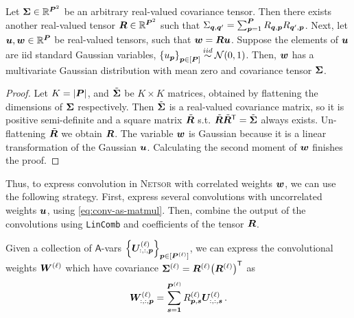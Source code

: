 \documentclass[accepted]{uai2021} %
\newcommand{\Netsor}{\textsc{Netsor}\xspace}
\newcommand{\Ava}{\mathsf{A}}
\newcommand{\LinComb}{\texttt{LinComb}\xspace}
\newcommand{\layerU}[1]{\vU^{(#1)}}
\newcommand{\layerW}[1]{\mW^{(#1)}}
\newcommand{\patchsizebase}{\vP}
\newcommand{\patchsize}[1]{{\patchsizebase^{\bra{#1}}}}
\newcommand{\priorWcov}[1]{\boldsymbol{\Sigma}^{(#1)}}
\newcommand{\patch}{\vp}               %
\newcommand{\nextpatch}{\vq}
\newcommand{\0}{\boldsymbol{0}}
\newcommand{\1}{\boldsymbol{1}}
\begin{document}
\begin{lemma}
  Let $\mSigma \in \sR^{\patchsizebase^{2}}$ be an arbitrary real-valued covariance tensor.
  Then there exists another real-valued tensor $\mR \in \sR^{\patchsizebase^{2}}$ such that $\Sigma_{\nextpatch,\nextpatch'} = \sum_{\patch=1}^{\patchsizebase}R_{\nextpatch,\patch} R_{\nextpatch',\patch}$.
  Next, let $\vu,\vw \in \sR^{\patchsizebase}$ be real-valued tensors, such that ${\bm{w}} = {\bm{R}} {\bm{u}}$. Suppose the elements of ${\bm{u}}$ are \ac{iid} standard Gaussian variables, $\cb{u_\patch}_{\patch \in \countto{\patchsizebase}} \simiid \Normal{0, 1}$. Then, ${\bm{w}}$ has a multivariate Gaussian distribution with mean zero and covariance tensor ${\boldsymbol\Sigma}$.
  \label{lemma:R}
\end{lemma}
\begin{proof}
  Let $K = \abs{\patchsizebase}$, and $\tilde{{\bm{\Sigma}}}$ be $K \times K$ matrices, obtained by flattening the dimensions of ${\bm{\Sigma}}$ respectively.
  Then $\tilde{{\bm{\Sigma}}}$ is a real-valued covariance matrix, so it is positive semi-definite and
  a square matrix $\tilde{{\bm{R}}}$ s.t. $\tilde{{\bm{R}}}{\tilde{{\bm{R}}}}^{\mathsf{T}} = \tilde{{\bm{\Sigma}}}$ always exists. Un-flattening $\tilde{{\bm{R}}}$ we obtain ${\bm{R}}$. The variable ${\bm{w}}$ is Gaussian because it is
  a linear transformation of the Gaussian ${\bm{u}}$. Calculating the second moment of ${\bm{w}}$ finishes the proof.
\end{proof}
Thus, to express convolution in \Netsor with correlated weights ${\bm{w}}$, we can use the
following strategy. First, express several convolutions with uncorrelated
weights ${\bm{u}}$, using \cref{eq:conv-as-matmul}. Then, combine the output of the convolutions using \LinComb and coefficients of
the tensor ${\bm{R}}$.

Given a collection of $\Ava$-vars
$\cb{\layerU{\ell}_{:,:,\patch}}_{\patch \in \countto{\patchsize{\ell}}}$, we
can express the convolutional weights $\layerW{\ell}$ which have covariance
$\priorWcov{\ell} = \mR\ssup{\ell} \bra{\mR\ssup{\ell}}^{\tp}$ as
\begin{equation}
  \layerW{\ell}_{:,:,\patch} = \sum_{\vs=\1}^{\patchsize{\ell}}
  R\ssup{\ell}_{\patch,\vs}\layerU{\ell}_{:,:,\vs}\,.
\end{equation}
\end{document}
